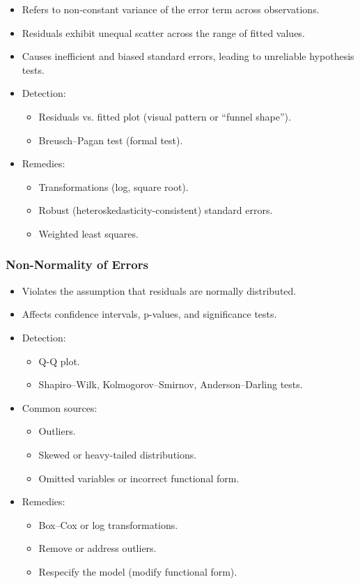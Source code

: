 \documentclass[11pt,a4paper]{article}
\begin{document}
\begin{itemize}
    \item Refers to non-constant variance of the error term across observations.
    \item Residuals exhibit unequal scatter across the range of fitted values.
    \item Causes inefficient and biased standard errors, leading to unreliable hypothesis tests.
    \item Detection:
    \begin{itemize}
        \item Residuals vs. fitted plot (visual pattern or “funnel shape”).
        \item Breusch–Pagan test (formal test).
    \end{itemize}
    \item Remedies:
    \begin{itemize}
        \item Transformations (log, square root).
        \item Robust (heteroskedasticity-consistent) standard errors.
        \item Weighted least squares.
    \end{itemize}
\end{itemize}

\subsubsection{Non-Normality of Errors}

\begin{itemize}
    \item Violates the assumption that residuals are normally distributed.
    \item Affects confidence intervals, p-values, and significance tests.
    \item Detection:
    \begin{itemize}
        \item Q-Q plot.
        \item Shapiro–Wilk, Kolmogorov–Smirnov, Anderson–Darling tests.
    \end{itemize}
    \item Common sources:
    \begin{itemize}
        \item Outliers.
        \item Skewed or heavy-tailed distributions.
        \item Omitted variables or incorrect functional form.
    \end{itemize}
    \item Remedies:
    \begin{itemize}
        \item Box–Cox or log transformations.
        \item Remove or address outliers.
        \item Respecify the model (modify functional form).
    \end{itemize}
\end{itemize}
\end{document}
